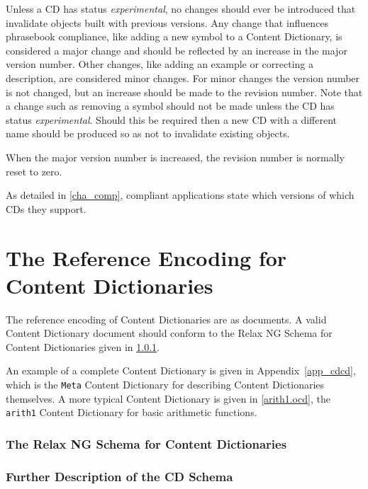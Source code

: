 Unless a CD has status \emph{experimental}, no changes should ever be introduced that
invalidate objects built with previous versions.  Any change that influences phrasebook
compliance, like adding a new symbol to a Content Dictionary, is considered a major change
and should be reflected by an increase in the major version number. Other changes, like
adding an example or correcting a description, are considered minor changes. For minor
changes the version number is not changed, but an increase should be made to the revision
number.  Note that a change such as removing a symbol should not be made unless the CD has
status \emph{experimental}.  Should this be required then a new CD with a different name
should be produced so as not to invalidate existing objects.
      
When the major version number is increased, the revision number is normally reset to zero.
      
As detailed in \ref{cha_comp}, \OM compliant applications state which versions of which
CDs they support.
  
\section{The Reference Encoding for Content Dictionaries}\label{sec_xml_cd}
    
The reference encoding of Content Dictionaries are as \XML documents.  A valid Content
Dictionary document should conform to the Relax NG Schema for Content Dictionaries given
in \ref{sec_cd_schema}.
    
An example of a complete Content Dictionary is given in Appendix~\ref{app_cdcd}, which is
the \lstinline|Meta| Content Dictionary for describing Content Dictionaries themselves. A
more typical Content Dictionary is given in \ref{arith1.ocd}, the \lstinline|arith1|
Content Dictionary for basic arithmetic functions.

    
\subsubsection{The Relax NG Schema for Content Dictionaries}\label{sec_cd_schema}



\subsubsection{Further Description of the CD Schema}\label{sect_pcdata}

